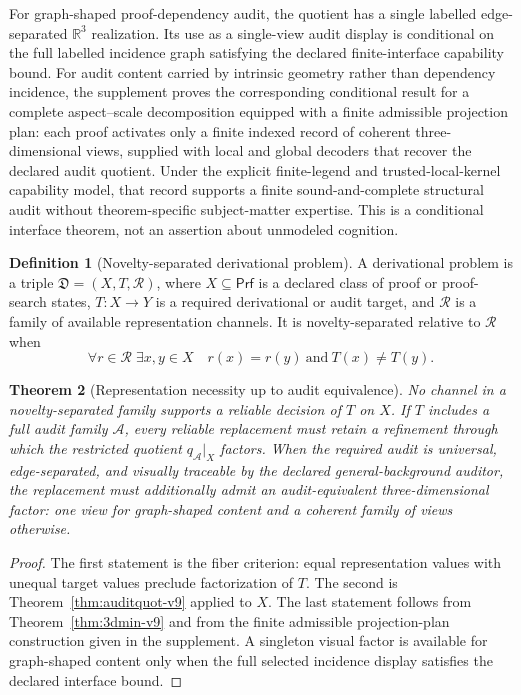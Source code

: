 \documentclass[11pt]{article}
\newcommand{\Proofs}{\ensuremath{\mathsf{Prf}}}
\newcommand{\AuditQuot}{\ensuremath{q_{\mathcal A}}}
\newcommand{\Rthree}{\ensuremath{\mathbb R^3}}
\theoremstyle{plain}
\newtheorem{theorem}{Theorem}[section]
\theoremstyle{definition}
\newtheorem{definition}[theorem]{Definition}
\theoremstyle{remark}
\begin{document}
For graph-shaped proof-dependency audit, the quotient has a single labelled
edge-separated $\Rthree$ realization.  Its use as a single-view audit display is
conditional on the full labelled incidence graph satisfying the declared
finite-interface capability bound.  For audit content carried by intrinsic
geometry rather than dependency incidence, the supplement proves the
corresponding conditional result for a complete aspect--scale decomposition
equipped with a finite admissible projection plan: each proof activates only a
finite indexed record of coherent three-dimensional views, supplied with local
and global decoders that recover the declared audit quotient.  Under the
explicit finite-legend and trusted-local-kernel capability model, that record
supports a finite sound-and-complete structural audit without theorem-specific
subject-matter expertise.  This is a conditional interface theorem, not an
assertion about unmodeled cognition.

\begin{definition}[Novelty-separated derivational problem]
\label{def:novel-v9}
A derivational problem is a triple $\mathfrak D=(X,T,\mathcal R)$, where
$X\subseteq\Proofs$ is a declared class of proof or proof-search states,
$T:X\to Y$ is a required derivational or audit target, and $\mathcal R$ is a
family of available representation channels.  It is novelty-separated relative
to $\mathcal R$ when
\[
\forall r\in\mathcal R\;\exists x,y\in X
\quad r(x)=r(y)\ \text{and}\ T(x)\neq T(y).
\]
\end{definition}

\begin{theorem}[Representation necessity up to audit equivalence]
\label{thm:necessity-v9}
No channel in a novelty-separated family supports a reliable decision of $T$ on
$X$.  If $T$ includes a full audit family $\mathcal A$, every reliable
replacement must retain a refinement through which the restricted quotient
$\AuditQuot|_X$ factors.  When the required audit is universal,
edge-separated, and visually traceable by the declared general-background
auditor, the replacement must additionally admit an audit-equivalent
three-dimensional factor: one view for graph-shaped content and a coherent
family of views otherwise.
\end{theorem}

\begin{proof}
The first statement is the fiber criterion: equal representation values with
unequal target values preclude factorization of $T$.  The second is
Theorem~\ref{thm:auditquot-v9} applied to $X$.  The last statement follows from
Theorem~\ref{thm:3dmin-v9} and from the finite admissible projection-plan
construction given in the supplement.  A singleton visual factor is available
for graph-shaped content only when the full selected incidence display satisfies
the declared interface bound.
\end{proof}
\end{document}

